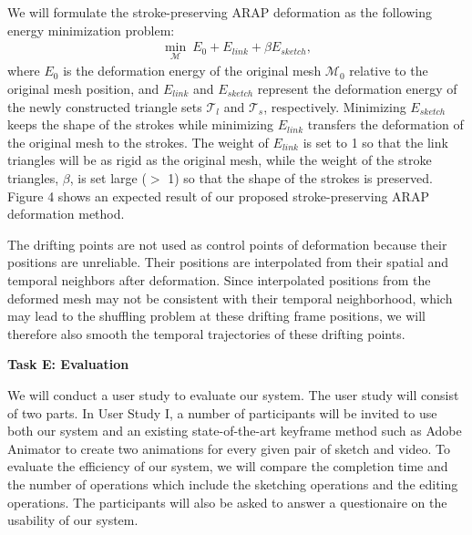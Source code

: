 {We will formulate the stroke-preserving ARAP deformation as the following energy minimization problem: 
\begin{align}
\min_\mathcal{M} \ E_0 + E_{link} + \beta E_{sketch},
\end{align}
where $ E_0 $ is the deformation energy of the original mesh $ \mathcal{M}_0 $ relative to the original mesh position, and $ E_{link} $ and $ E_{sketch} $ represent the deformation energy of the newly constructed triangle sets $\mathcal{T}_l $ and $\mathcal{T}_s $, respectively. Minimizing $ E_{sketch} $ keeps the shape of the strokes while minimizing $ E_{link} $ transfers the deformation of the original mesh to the strokes. The weight of $ E_{link} $ is set to 1 so that the link triangles will be as rigid as the original mesh, while the weight of the stroke triangles, $ \beta $, is set large ($ > $ 1) so that the shape of the strokes is preserved. 
%
Figure 4 shows an expected result of our proposed stroke-preserving ARAP deformation method.

The drifting points are not used as control points of deformation because their positions are unreliable. Their positions are interpolated from their spatial and temporal neighbors after deformation. Since interpolated positions from the deformed mesh may not be consistent with their temporal neighborhood, which may lead to the {shuffling problem at these drifting frame positions}, we will therefore also smooth the {temporal} trajectories of these drifting points. 

\textbf{Task E: Evaluation}


We will conduct a user study to evaluate our system. The user study will consist of two parts. In User Study I, a number of participants will be invited to use both our system and an existing state-of-the-art keyframe method such as Adobe Animator to create two animations for every given pair of sketch and video. 
To evaluate the efficiency of our system, 
we will compare the completion time and the number of operations which include the sketching operations and the editing operations. 
The participants will also be asked to answer a questionaire on the usability of our system. 

}
